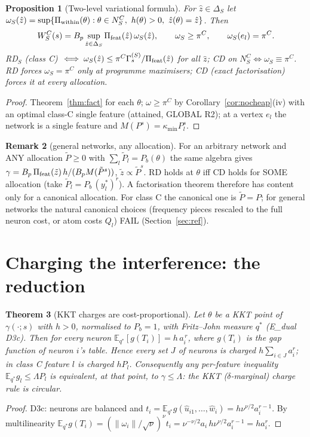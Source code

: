 \documentclass[11pt]{article}
\newtheorem{theorem}{Theorem}
\newtheorem{proposition}[theorem]{Proposition}
\theoremstyle{definition}
\newtheorem{remark}[theorem]{Remark}
\begin{document}
\begin{proposition}[Two-level variational formula]\label{prop:var}
For $\hat z\in\Delta_S$ let $\omega_S(\hat z)=\sup\{\Pi_{\rm within}(\theta):\theta\in N^C_S,\ h(\theta)>0,\ \hat z(\theta)=\hat z\}$. Then
\[W^C_S(s)=B_p\sup_{\hat z\in\Delta_S}\Pi_{\rm feat}(\hat z)\,\omega_S(\hat z),\qquad \omega_S\ge\pi^C,\qquad\omega_S(e_l)=\pi^C .\]
RD$_S$ (class C) $\iff\omega_S(\hat z)\le\pi^C\Gamma^{(S)}_s/\Pi_{\rm feat}(\hat z)$ for all $\hat z$; CD on $N^C_S\iff\omega_S\equiv\pi^C$.
RD forces $\omega_S=\pi^C$ only at programme maximisers; CD (exact factorisation) forces it at every allocation.
\end{proposition}
\begin{proof} Theorem~\ref{thm:fact} for each $\theta$; $\omega\ge\pi^C$ by Corollary~\ref{cor:nocheap}(iv) with an optimal class-C
single feature (attained, GLOBAL R2); at a vertex $e_l$ the network is a single feature and $M(P^s)=\kappa_{\min}P_l^s$.\end{proof}

\begin{remark}[general networks, any allocation]
For an arbitrary network and ANY allocation $\tilde P\ge0$ with $\sum_l\tilde P_l=P_b(\theta)$ the same algebra gives
$\gamma=B_p\,\Pi_{\rm feat}(\tilde z)\,h/(B_pM(\tilde P^s))$, $\tilde z\propto\tilde P^s$. RD holds at $\theta$ iff CD holds for SOME
allocation (take $\tilde P_l=P_b\,(y^*_l)^r$). A factorisation theorem therefore has content only for a canonical allocation.
For class C the canonical one is $\tilde P=P$; for general networks the natural canonical choices (frequency pieces rescaled to
the full neuron cost, or atom costs $Q_l$) FAIL (Section~\ref{sec:ref}).
\end{remark}

\section{Charging the interference: the reduction}

\begin{theorem}[KKT charges are cost-proportional]\label{thm:kkt}
Let $\theta$ be a KKT point of $\gamma(\cdot;s)$ with $h>0$, normalised to $P_b=1$, with Fritz--John measure $q^*$ (E\_dual D3c).
Then for every neuron $\mathbb E_{q^*}[g(T_i)]=h\,a_i^{\,r}$, where $g(T_i)$ is the gap function of neuron $i$'s table.
Hence every set $J$ of neurons is charged $h\sum_{i\in J}a_i^r$; in class C feature $l$ is charged $hP_l$.
Consequently any per-feature inequality $\mathbb E_{q^*}g_l\le\Lambda P_l$ is equivalent, at that point, to $\gamma\le\Lambda$:
the KKT ($\delta$-marginal) charge rule is circular.
\end{theorem}
\begin{proof} D3c: neurons are balanced and $t_i=\mathbb E_{q^*}g(\hat u_{i1},\dots,\hat w_i)=h\nu^{\nu/2}a_i^{r-1}$. By multilinearity
$\mathbb E_{q^*}g(T_i)=(\|\omega_i\|/\sqrt\nu)^\nu t_i=\nu^{-\nu/2}a_i\,h\nu^{\nu/2}a_i^{r-1}=ha_i^r$.\end{proof}
\end{document}
